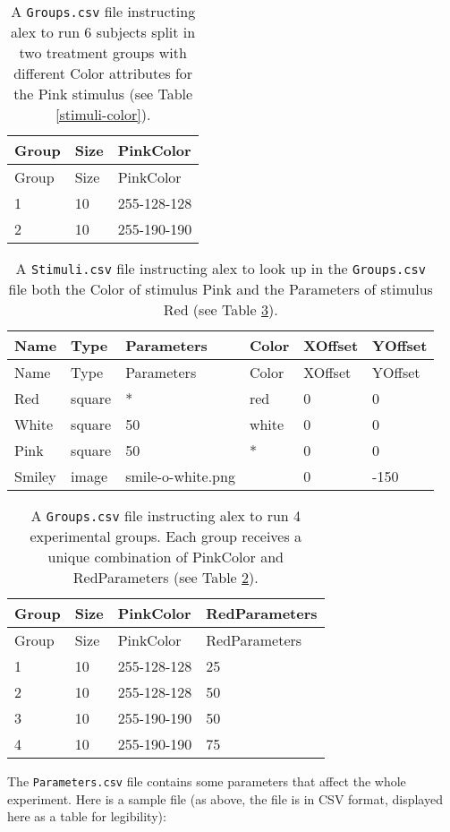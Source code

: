 \documentclass[11pt,]{article}
\begin{document}
\begin{longtable}[c]{@{}lll@{}}
\caption{A \texttt{Groups.csv} file instructing alex to run 6 subjects
split in two treatment groups with different Color attributes for the
Pink stimulus (see Table \ref{stimuli-color}).
\label{subjects-color}}\tabularnewline
\toprule
Group & Size & PinkColor\tabularnewline
\midrule
\endfirsthead
\toprule
Group & Size & PinkColor\tabularnewline
\midrule
\endhead
1 & 10 & 255-128-128\tabularnewline
2 & 10 & 255-190-190\tabularnewline
\bottomrule
\end{longtable}

\begin{longtable}[c]{@{}llllll@{}}
\caption{A \texttt{Stimuli.csv} file instructing alex to look up in the
\texttt{Groups.csv} file both the Color of stimulus Pink and the
Parameters of stimulus Red (see Table \ref{subjects-color-parameters}).
\label{stimuli-color-parameters}}\tabularnewline
\toprule
Name & Type & Parameters & Color & XOffset & YOffset\tabularnewline
\midrule
\endfirsthead
\toprule
Name & Type & Parameters & Color & XOffset & YOffset\tabularnewline
\midrule
\endhead
Red & square & * & red & 0 & 0\tabularnewline
White & square & 50 & white & 0 & 0\tabularnewline
Pink & square & 50 & * & 0 & 0\tabularnewline
Smiley & image & smile-o-white.png & & 0 & -150\tabularnewline
\bottomrule
\end{longtable}

\begin{longtable}[c]{@{}llll@{}}
\caption{A \texttt{Groups.csv} file instructing alex to run 4
experimental groups. Each group receives a unique combination of
PinkColor and RedParameters (see Table \ref{stimuli-color-parameters}).
\label{subjects-color-parameters}}\tabularnewline
\toprule
Group & Size & PinkColor & RedParameters\tabularnewline
\midrule
\endfirsthead
\toprule
Group & Size & PinkColor & RedParameters\tabularnewline
\midrule
\endhead
1 & 10 & 255-128-128 & 25\tabularnewline
2 & 10 & 255-128-128 & 50\tabularnewline
3 & 10 & 255-190-190 & 50\tabularnewline
4 & 10 & 255-190-190 & 75\tabularnewline
\bottomrule
\end{longtable}


The \texttt{Parameters.csv} file contains some parameters that affect
the whole experiment. Here is a sample file (as above, the file is in
CSV format, displayed here as a table for legibility):
\end{document}
